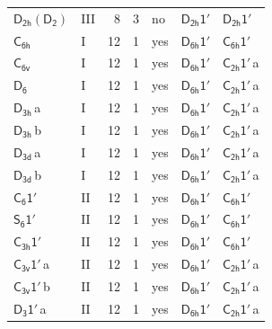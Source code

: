 \documentclass[10pt,a4paper]{article}
\numberwithin{equation}{section}
\newcommand{\grp}[1]{\mathsf{#1}}
\newcommand{\clsletter}[1]{\,{\scriptsize\color{black!55}#1}}
\begin{document}
{\begin{longtable}{@{}llrrlll@{}}
\href{D2h-D2.pdf}{$\grp{D_{2h}}(\grp{D_{2}})$} & III & 8 & 3 & no & \href{D2h-1p.pdf}{$\grp{D_{2h}1'}$} & \href{D2h-1p.pdf}{$\grp{D_{2h}1'}$}\\
\href{../../../rotation/data/pdf/C6h.pdf}{$\grp{C_{6h}}$} & I & 12 & 1 & yes & \href{D6h-1p.pdf}{$\grp{D_{6h}1'}$} & \href{C6h-1p.pdf}{$\grp{C_{6h}1'}$}\\
\href{../../../rotation/data/pdf/C6v.pdf}{$\grp{C_{6v}}$} & I & 12 & 1 & yes & \href{D6h-1p.pdf}{$\grp{D_{6h}1'}$} & \href{C2h-1p.pdf}{$\grp{C_{2h}1'}$}\clsletter{a}\\
\href{../../../rotation/data/pdf/D6.pdf}{$\grp{D_{6}}$} & I & 12 & 1 & yes & \href{D6h-1p.pdf}{$\grp{D_{6h}1'}$} & \href{C2h-1p.pdf}{$\grp{C_{2h}1'}$}\clsletter{a}\\
\href{../../../rotation/data/pdf/D3h.pdf}{$\grp{D_{3h}}$}\clsletter{a} & I & 12 & 1 & yes & \href{D6h-1p.pdf}{$\grp{D_{6h}1'}$} & \href{C2h-1p.pdf}{$\grp{C_{2h}1'}$}\clsletter{a}\\
\href{../../../rotation/data/pdf/D3h.pdf}{$\grp{D_{3h}}$}\clsletter{b} & I & 12 & 1 & yes & \href{D6h-1p.pdf}{$\grp{D_{6h}1'}$} & \href{C2h-1p.pdf}{$\grp{C_{2h}1'}$}\clsletter{a}\\
\href{../../../rotation/data/pdf/D3d.pdf}{$\grp{D_{3d}}$}\clsletter{a} & I & 12 & 1 & yes & \href{D6h-1p.pdf}{$\grp{D_{6h}1'}$} & \href{C2h-1p.pdf}{$\grp{C_{2h}1'}$}\clsletter{a}\\
\href{../../../rotation/data/pdf/D3d.pdf}{$\grp{D_{3d}}$}\clsletter{b} & I & 12 & 1 & yes & \href{D6h-1p.pdf}{$\grp{D_{6h}1'}$} & \href{C2h-1p.pdf}{$\grp{C_{2h}1'}$}\clsletter{a}\\
\href{C6-1p.pdf}{$\grp{C_{6}1'}$} & II & 12 & 1 & yes & \href{D6h-1p.pdf}{$\grp{D_{6h}1'}$} & \href{C6h-1p.pdf}{$\grp{C_{6h}1'}$}\\
\href{S6-1p.pdf}{$\grp{S_{6}1'}$} & II & 12 & 1 & yes & \href{D6h-1p.pdf}{$\grp{D_{6h}1'}$} & \href{C6h-1p.pdf}{$\grp{C_{6h}1'}$}\\
\href{C3h-1p.pdf}{$\grp{C_{3h}1'}$} & II & 12 & 1 & yes & \href{D6h-1p.pdf}{$\grp{D_{6h}1'}$} & \href{C6h-1p.pdf}{$\grp{C_{6h}1'}$}\\
\href{C3v-1p.pdf}{$\grp{C_{3v}1'}$}\clsletter{a} & II & 12 & 1 & yes & \href{D6h-1p.pdf}{$\grp{D_{6h}1'}$} & \href{C2h-1p.pdf}{$\grp{C_{2h}1'}$}\clsletter{a}\\
\href{C3v-1p.pdf}{$\grp{C_{3v}1'}$}\clsletter{b} & II & 12 & 1 & yes & \href{D6h-1p.pdf}{$\grp{D_{6h}1'}$} & \href{C2h-1p.pdf}{$\grp{C_{2h}1'}$}\clsletter{a}\\
\href{D3-1p.pdf}{$\grp{D_{3}1'}$}\clsletter{a} & II & 12 & 1 & yes & \href{D6h-1p.pdf}{$\grp{D_{6h}1'}$} & \href{C2h-1p.pdf}{$\grp{C_{2h}1'}$}\clsletter{a}\\

\end{longtable}}
\end{document}
